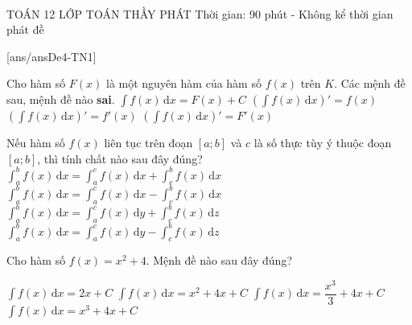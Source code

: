 ﻿﻿\begin{name}
	{\tenchude}
	{TOÁN 12}
	{LỚP TOÁN THẦY PHÁT}
	{Thời gian: 90 phút - Không kể thời gian phát đề}
\end{name}
\TN
{}[ans/ansDe4-TN1]
\begin{ex}%
	Cho hàm số $F(x)$ là một nguyên hàm của hàm số $f(x)$ trên $K$. Các mệnh đề sau, mệnh đề nào \textbf{sai}.
	\choice
	{$\displaystyle\int{f(x)\mathrm{\,d}x=}F(x)+C$}
	{$\displaystyle{\left(\displaystyle\int{f(x)\mathrm{\,d}x}\right)'}=f(x)$}
	{\True $\displaystyle{\left(\displaystyle\int{f(x)\mathrm{\,d}x}\right)'}=f'(x)$}
	{$\displaystyle{\left(\displaystyle\int{f(x)\mathrm{\,d}x}\right)'}=F'(x)$}
\end{ex}

\begin{ex}%
	Nếu hàm số $f(x)$ liên tục trên đoạn $[a;b]$ và $c$ là số thực tùy ý thuộc đoạn $[a;b]$, thì tính chất nào sau đây đúng?
	\choice
	{\True $\displaystyle\int_a^b f(x) \mathrm{\,d}x = \displaystyle\int_a^c f(x) \mathrm{\,d}x + \displaystyle\int_c^b f(x)\mathrm{\,d}x$}
	{$\displaystyle\int_a^b f(x)\mathrm{\,d}x = \displaystyle\int_a^c f(x) \mathrm{\,d}x - \displaystyle\int_c^b f(x) \mathrm{\,d}x$}
	{$\displaystyle\int_a^b f(x)\mathrm{\,d}x = \displaystyle\int_a^c f(x)\mathrm{\,d}y + \displaystyle\int_c^b f(x) \mathrm{\,d}z$}
	{$\displaystyle\int_a^b f(x)\mathrm{\,d}x = \displaystyle\int_a^c f(x)\mathrm{\,d}y - \displaystyle\int_c^b f(x)\mathrm{\,d}z$}
\end{ex}

\begin{ex}%
	Cho hàm số $f(x)=x^2+4$. Mệnh đề nào sau đây đúng?

	\choice
	{$\displaystyle{\displaystyle\int f(x)\mathrm{\,d}x=2 x+C}$}
	{$\displaystyle{\displaystyle\int f(x)\mathrm{\,d}x=x^2+4 x+C}$}
	{\True $\displaystyle{\displaystyle\int f(x)\mathrm{\,d}x=\dfrac{x^3}{3}+4 x+C}$}
	{$\displaystyle{\displaystyle\int f(x)\mathrm{\,d}x=x^3+4 x+C}$}
\end{ex}

